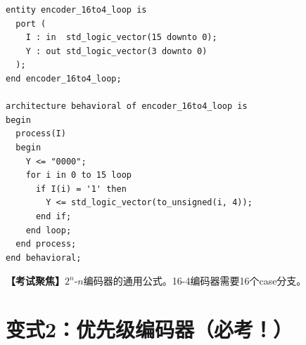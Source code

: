 \begin{detailbox}[完整教学]
\begin{lstlisting}[caption={16-4编码器VHDL实现（for循环版本）}]
entity encoder_16to4_loop is
  port (
    I : in  std_logic_vector(15 downto 0);
    Y : out std_logic_vector(3 downto 0)
  );
end encoder_16to4_loop;

architecture behavioral of encoder_16to4_loop is
begin
  process(I)
  begin
    Y <= "0000";
    for i in 0 to 15 loop
      if I(i) = '1' then
        Y <= std_logic_vector(to_unsigned(i, 4));
      end if;
    end loop;
  end process;
end behavioral;
\end{lstlisting}

\textbf{【考试聚焦】}$2^n$-$n$编码器的通用公式。16-4编码器需要16个case分支。
\end{detailbox}


\section{变式2：优先级编码器（必考！）}

